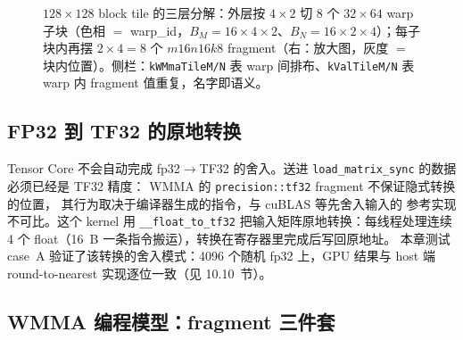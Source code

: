 \begin{figure}[H]
\caption{$128\times128$ block tile 的三层分解：外层按 $4\times2$ 切 8 个 $32\times64$ warp 子块（色相 $=$ warp\_id，$B_M = 16\times4\times2$、$B_N = 16\times2\times4$）；每子块内再摆 $2\times4=8$ 个 $m16n16k8$ fragment（右：放大图，灰度 $=$ 块内位置）。侧栏：\texttt{kWMmaTileM/N} 表 warp 间排布、\texttt{kValTileM/N} 表 warp 内 fragment 值重复，名字即语义。}
\label{fig:10-wmma-hierarchy}
\end{figure}

\subsection{FP32 到 TF32 的原地转换}



Tensor Core 不会自动完成 fp32$\to$TF32 的舍入。送进
\texttt{load\_\allowbreak{}matrix\_\allowbreak{}sync} 的数据必须已经是 TF32 精度：
WMMA 的 \texttt{precision::\allowbreak{}tf32} fragment 不保证隐式转换的位置，
其行为取决于编译器生成的指令，与 cuBLAS 等先舍入输入的
参考实现不可比。这个 kernel 用
\texttt{\_\allowbreak{}\_\allowbreak{}float\_\allowbreak{}to\_\allowbreak{}tf32} 把输入矩阵原地转换：每线程处理连续
4 个 float（16~B 一条指令搬运），转换在寄存器里完成后写回原地址。
本章测试 case~A 验证了该转换的舍入模式：4096 个随机 fp32 上，GPU 结果与
host 端 round-to-nearest 实现逐位一致（见 10.10~节）。

\subsection{WMMA 编程模型：fragment 三件套}

